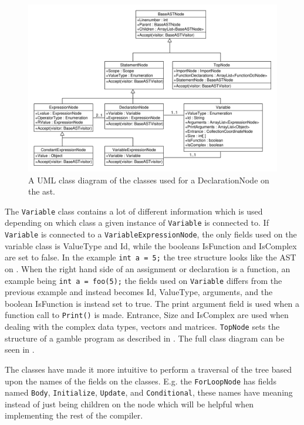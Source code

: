 \begin{figure}[!ht]
\centering
 \includegraphics[width=1\textwidth]{figures/ClassDiagrams/ASTDeclarationNodeMoreInfo.pdf} %
\caption{A UML class diagram of the classes used for a DeclarationNode on the \acrshort{ast}.}\label{image:ASTDecl}
\vspace{-15pt}
\end{figure}

The \texttt{Variable} class contains a lot of different information which is used depending on which class a given instance of \texttt{Variable} is connected to.
If \texttt{Variable} is connected to a \texttt{VariableExpressionNode}, the only fields used on the variable class is ValueType and Id, while the booleans IsFunction and IsComplex are set to false.
In the example \texttt{int a = 5;} the tree structure looks like the AST on .
When the right hand side of an assignment or declaration is a function, an example being \texttt{int a = foo(5);} the fields used on \texttt{Variable} differs from the previous example and instead becomes Id, ValueType, arguments, and the boolean IsFunction is instead set to true.
The print argument field is used when a function call to \texttt{Print()} is made. 
Entrance, Size and IsComplex are used when dealing with the complex data types, vectors and matrices.
\texttt{TopNode} sets the structure of a \gls{gamble} program as described in .
The full class diagram can be seen in .

The classes have made it more intuitive to perform a traversal of the tree based upon the names of the fields on the classes.
E.g. the \texttt{ForLoopNode} has fields named \texttt{Body}, \texttt{Initialize}, \texttt{Update}, and \texttt{Conditional}, these names have meaning instead of just being children on the node which will be helpful when implementing the rest of the compiler.

